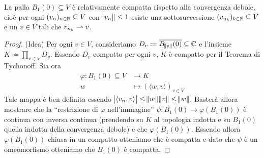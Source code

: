 \begin{thm} \label{thm:Banach-Alaoglu-facile}
    La palla $ B_1(0) \subseteq V $ è relativamente compatta rispetto alla convergenza debole, cioè per ogni $ (v_n)_{n \in \mathbb{N}} \subseteq V $ con $ \norm{v_n} \leq 1 $ esiste una sottosuccessione $ (v_{n_k})_{k \in \mathbb{N}} \subseteq V $ e un $ v \in V $ tali che $ v_{n_k} \rightharpoonup v $.
\end{thm}
\begin{proof}
    (Idea)
    Per ogni $ v \in V $, consideriamo $ D_v \coloneqq \overline{B_{\norm{v}}(0)} \subseteq \mathbb{C} $ e l'insieme $ K \coloneqq \prod_{v \in V} D_v $. Essendo $ D_v $ compatto per ogni $ v $, $ K $ è compatto per il Teorema di Tychonoff. Sia ora 
    \begin{align*}
        \varphi \colon B_1(0) \subseteq V & \to K \\
        w & \mapsto ({\langle w, v \rangle})_{v \in V}
    \end{align*}
    Tale mappa è ben definita essendo $ \abs{{\langle v_n, v \rangle}} \leq \norm{w} \norm{v} \leq \norm{w} $. Basterà allora mostrare che la ``restrizione di $ \varphi $ nell'immagine'' $ \psi \colon B_1(0) \to \varphi(B_1(0)) $ è continua con inversa continua (prendendo su $ K $ al topologia indotta e su $ B_1(0) $ quella indotta della convergenza debole) e che $ \varphi(B_1(0)) $. Essendo allora $ \varphi(B_1(0)) $ chiusa in un compatto otteniamo che è compatta e dato che $ \psi $ è un omeomorfismo otteniamo che $ B_1(0) $ è compatta.
\end{proof}

